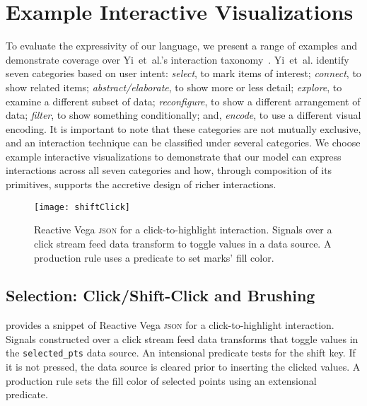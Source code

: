 \section{Example Interactive Visualizations}
\label{sec:vg:examples}

\vspace{-10pt}

To evaluate the expressivity of our language, we present a range of examples and
demonstrate coverage over Yi~et~al.'s interaction
taxonomy~\cite{yi:understanding}. Yi~et~al. identify seven categories based on
user intent: \emph{select}, to mark items of interest; \emph{connect}, to show
related items; \emph{abstract/elaborate}, to show more or less detail;
\emph{explore}, to examine a different subset of data; \emph{reconfigure}, to
show a different arrangement of data; \emph{filter}, to show something
conditionally; and, \emph{encode}, to use a different visual encoding. It is
important to note that these categories are not mutually exclusive, and an
interaction technique can be classified under several categories. We choose
example interactive visualizations to demonstrate that our model can express
interactions across all seven categories and how, through composition of its
primitives, supports the accretive design of richer interactions.

\begin{figure}[h!]
  \centering
  \texttt{[image: shiftClick]}
  \caption{Reactive Vega \textsc{json} for a click-to-highlight interaction.
  Signals over a click stream feed data transform to toggle values in a data
  source. A production rule uses a predicate to set marks' fill color.}
  \label{fig:vg:shiftClick}
\end{figure}

\subsection{Selection: Click/Shift-Click and Brushing}

\vspace{-7pt}

 provides a snippet of Reactive Vega \textsc{json} for a
click-to-highlight interaction. Signals constructed over a click stream feed
data transforms that toggle values in the \texttt{selected\_pts} data source. An
intensional predicate tests for the shift key. If it is not pressed, the data
source is cleared prior to inserting the clicked values. A production rule sets
the fill color of selected points using an extensional predicate.

